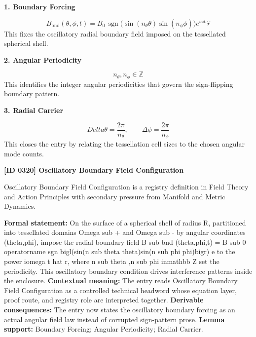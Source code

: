 \noindent\textbf{1. Boundary Forcing}\par
\[
B_{\mathrm{bnd}}(\theta,\phi,t)=B_0\,\operatorname{sgn}\!\bigl(\sin(n_{\theta}\theta)\sin(n_{\phi}\phi)\bigr)e^{i\omega t}\,\hat r
\]
\noindent This fixes the oscillatory radial boundary field imposed on the tessellated spherical shell.\par
\noindent\textbf{2. Angular Periodicity}\par
\[
n_{\theta},n_{\phi}\in \mathbb{Z}
\]
\noindent This identifies the integer angular periodicities that govern the sign-flipping boundary pattern.\par
\noindent\textbf{3. Radial Carrier}\par
\[
Delta\theta=\frac{2\pi}{n_{\theta}},\qquad \Delta\phi=\frac{2\pi}{n_{\phi}}
\]
\noindent This closes the entry by relating the tessellation cell sizes to the chosen angular mode counts.\par

\clearpage
\noindent\textbf{[ID 0320] Oscillatory Boundary Field Configuration}\par
\vspace{0.35em}
\begingroup\small
{}
Oscillatory Boundary Field Configuration is a registry definition in Field Theory and Action Principles with secondary pressure from Manifold and Metric Dynamics.

\begingroup\footnotesize\setlength{\emergencystretch}{3em}\sloppy
\textbf{Formal statement:} On the surface of a spherical shell of radius R, partitioned into tessellated domains Omega sub + and Omega sub - by angular coordinates (theta,phi), impose the radial boundary field B sub bnd (theta,phi,t) = B sub 0 operatorname sgn bigl(sin(n sub theta theta)sin(n sub phi phi)bigr) e to the power iomega t hat r, where n sub theta ,n sub phi inmathbb Z set the periodicity. This oscillatory boundary condition drives interference patterns inside the enclosure. \textbf{Contextual meaning:} The entry reads Oscillatory Boundary Field Configuration as a controlled technical headword whose equation layer, proof route, and registry role are interpreted together. \textbf{Derivable consequences:} The entry now states the oscillatory boundary forcing as an actual angular field law instead of corrupted sign-pattern prose. \textbf{Lemma support:} Boundary Forcing; Angular Periodicity; Radial Carrier.\par
\endgroup


